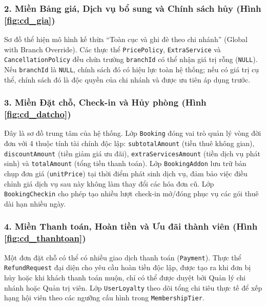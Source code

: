 
\subsubsection{2. Miền Bảng giá, Dịch vụ bổ sung và Chính sách hủy (Hình \ref{fig:cd_gia})}
Sơ đồ thể hiện mô hình kế thừa ``Toàn cục và ghi đè theo chi nhánh'' (Global with Branch Override). Các thực thể \texttt{PricePolicy}, \texttt{ExtraService} và \texttt{CancellationPolicy} đều chứa trường \texttt{branchId} có thể nhận giá trị rỗng (\texttt{NULL}). Nếu \texttt{branchId} là \texttt{NULL}, chính sách đó có hiệu lực toàn hệ thống; nếu có giá trị cụ thể, chính sách đó là độc quyền của chi nhánh và được ưu tiên áp dụng trước.


\subsubsection{3. Miền Đặt chỗ, Check-in và Hủy phòng (Hình \ref{fig:cd_datcho})}
Đây là sơ đồ trung tâm của hệ thống. Lớp \texttt{Booking} đóng vai trò quản lý vòng đời đơn với 4 thuộc tính tài chính độc lập: \texttt{subtotalAmount} (tiền thuê không gian), \texttt{discountAmount} (tiền giảm giá ưu đãi), \texttt{extraServicesAmount} (tiền dịch vụ phát sinh) và \texttt{totalAmount} (tổng tiền thanh toán). Lớp \texttt{BookingAddon} lưu trữ bản chụp đơn giá (\texttt{unitPrice}) tại thời điểm phát sinh dịch vụ, đảm bảo việc điều chỉnh giá dịch vụ sau này không làm thay đổi các hóa đơn cũ. Lớp \texttt{BookingCheckin} cho phép tạo nhiều lượt check-in mở/đóng phục vụ các gói thuê dài hạn nhiều ngày.


\subsubsection{4. Miền Thanh toán, Hoàn tiền và Ưu đãi thành viên (Hình \ref{fig:cd_thanhtoan})}
Một đơn đặt chỗ có thể có nhiều giao dịch thanh toán (\texttt{Payment}). Thực thể \texttt{RefundRequest} đại diện cho yêu cầu hoàn tiền độc lập, được tạo ra khi đơn bị hủy hoặc khi khách thanh toán muộn, chỉ có thể được duyệt bởi Quản lý chi nhánh hoặc Quản trị viên. Lớp \texttt{UserLoyalty} theo dõi tổng chi tiêu thực tế để xếp hạng hội viên theo các ngưỡng cấu hình trong \texttt{MembershipTier}.

